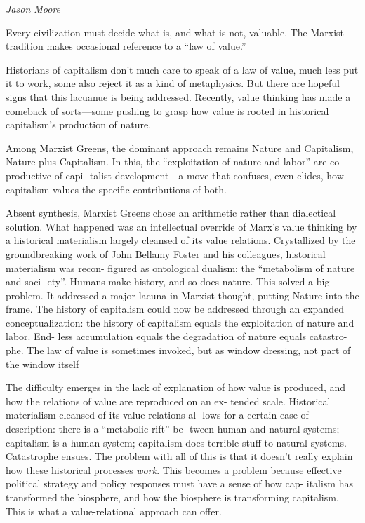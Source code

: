 \documentclass[
]{book}
\begin{document}
\emph{Jason Moore}

Every civilization must decide what is, and what is not, valuable.
The Marxist tradition makes occasional reference to a ``law of
value.''

Historians of
capitalism don't much care to speak of a law of value, much less put
it to work, some also reject it as
a kind of metaphysics. But there are hopeful signs that
this lacuanue is being addressed. Recently, value thinking has made a
comeback of sorts---some pushing to grasp how value is rooted in
historical capitalism's production of nature.

Among Marxist Greens, the dominant
approach remains Nature and Capitalism, Nature plus Capitalism. In
this, the ``exploitation of nature and labor'' are co-productive of capi-
talist development - a move that confuses, even elides,
how capitalism values the specific contributions of both.

Absent synthesis, Marxist Greens chose an arithmetic rather than
dialectical solution. What happened was an intellectual override of
Marx's value thinking by a historical materialism largely cleansed of
its value relations. Crystallized by the groundbreaking work of John
Bellamy Foster and his colleagues, historical materialism was recon-
figured as ontological dualism: the ``metabolism of nature and soci-
ety''. Humans make history, and so does nature.
This solved a big problem. It addressed a major lacuna in Marxist
thought, putting Nature into the frame. The history of capitalism
could now be addressed through an expanded conceptualization: the
history of capitalism equals the exploitation of nature and labor. End-
less accumulation equals the degradation of nature equals catastro-
phe. The law of value is sometimes invoked, but as window dressing,
not part of the window itself

The difficulty emerges in the lack of explanation of how value is
produced, and how the relations of value are reproduced on an ex-
tended scale. Historical materialism cleansed of its value relations al-
lows for a certain ease of description: there is a ``metabolic rift'' be-
tween human and natural systems; capitalism is a human system;
capitalism does terrible stuff to natural systems. Catastrophe ensues.
The problem with all of this is that it doesn't really explain how these
historical processes \emph{work}. This becomes a problem because effective
political strategy and policy responses must have a sense of how cap-
italism has transformed the biosphere, and how the biosphere is
transforming capitalism. This is what a value-relational approach can
offer.
\end{document}

